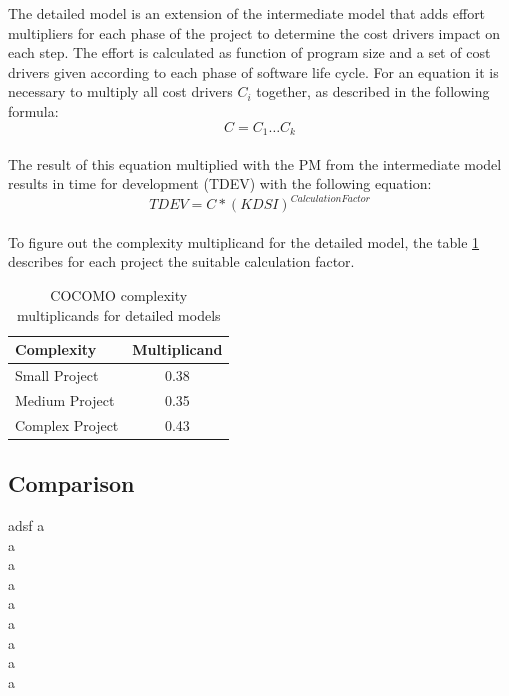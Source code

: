 The detailed model is an extension of the intermediate model that adds effort multipliers for each phase of the project to determine the cost drivers impact on each step. The effort is calculated as function of program size and a set of cost drivers given according to each phase of software life cycle. For an equation it is necessary to multiply all cost drivers \textbf{\(C_i\)} together, as described in the following formula:\\
\begin{equation}
C = C_1 \dots C_k \label{cocomo:detailedcostdrivers}
\end{equation}\\
The result of this equation multiplied with the PM from the intermediate model results in time for development (TDEV) with the following equation:\\
\begin{equation}
TDEV = C * (KDSI)^{Calculation Factor} \label{cocomo:detailed}
\end{equation}\\
To figure out the complexity multiplicand for the detailed model, the table \ref{cocomo:detailedComplexity} describes for each project the suitable calculation factor.\\
\begin{table}[h]
	\centering 
	\setlength{\tabcolsep}{4pt}
	\begin{tabular}{|l||c|}\hline
		Complexity	& Multiplicand\\ \hline\hline
		Small Project   	& 0.38        		\\ \hline
		Medium Project 		& 0.35        		\\ \hline
		Complex Project 	& 0.43 			\\ \hline
	\end{tabular} 
	\caption{COCOMO complexity multiplicands for detailed models} 
	\label{cocomo:detailedComplexity} 
\end{table}
\subsection{Comparison}

adsf
a\\
a\\
a\\
a\\
a\\
a\\
a\\
a\\
a

